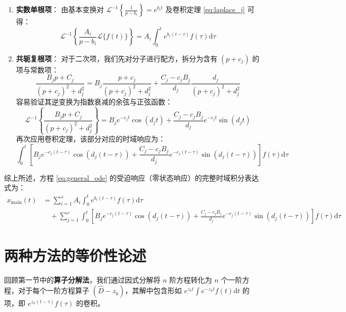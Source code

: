 \documentclass[11pt,a4paper]{ctexart}
\newcommand{\dd}{\mathrm{d}}
\begin{document}
\begin{enumerate}
    \item \textbf{实数单根项}：
    由基本变换对 \(\mathcal{L}^{-1}\left\{\frac{1}{p - b_i}\right\} = e^{b_i t}\) 及卷积定理 \eqref{eq:laplace_j} 可得：
    \begin{equation}
        \mathcal{L}^{-1}\left\{ \frac{A_i}{p - b_i} \mathcal{L}\{f(t)\} \right\} = A_i \int_{0}^{t} e^{b_i(t-\tau)} f(\tau) \dd \tau
    \end{equation}
    
    \item \textbf{共轭复根项}：
    对于二次项，我们先对分子进行配方，拆分为含有 \((p+c_j)\) 的项与常数项：
    \begin{equation}
        \frac{B_j p + C_j}{(p + c_j)^2 + d_j^2} = B_j \frac{p + c_j}{(p + c_j)^2 + d_j^2} + \frac{C_j - c_j B_j}{d_j} \frac{d_j}{(p + c_j)^2 + d_j^2}
    \end{equation}
    容易验证其逆变换为指数衰减的余弦与正弦函数：
    \begin{equation}
        \mathcal{L}^{-1}\left\{ \frac{B_j p + C_j}{(p + c_j)^2 + d_j^2} \right\} = B_j e^{-c_j t} \cos(d_j t) + \frac{C_j - c_j B_j}{d_j} e^{-c_j t} \sin(d_j t)
    \end{equation}
    再次应用卷积定理，该部分对应的时域响应为：
    \begin{equation}
        \int_{0}^{t} \left[ B_j e^{-c_j(t-\tau)} \cos(d_j(t-\tau)) + \frac{C_j - c_j B_j}{d_j} e^{-c_j(t-\tau)} \sin(d_j(t-\tau)) \right] f(\tau) \dd \tau
    \end{equation}
\end{enumerate}

综上所述，方程 \eqref{eq:general_ode} 的受迫响应（零状态响应）的完整时域积分表达式为：
\begin{align}
    x_{\text{main}}(t) &= \sum_{i=1}^{s} A_i \int_{0}^{t} e^{b_i(t-\tau)} f(\tau) \dd \tau \nonumber \\
    &\quad + \sum_{j=1}^{r} \int_{0}^{t} \left[ B_j e^{-c_j(t-\tau)} \cos(d_j(t-\tau)) + \frac{C_j - c_j B_j}{d_j} e^{-c_j(t-\tau)} \sin(d_j(t-\tau)) \right] f(\tau) \dd \tau
    \label{eq:final_solution}
\end{align}

\section{两种方法的等价性论述}

回顾第一节中的\textbf{算子分解法}，我们通过因式分解将 \(n\) 阶方程转化为 \(n\) 个一阶方程，对于每个一阶方程算子 \((\hat{D} - z_k)\)，其解中包含形如 \(e^{z_k t} \int e^{-z_k t} f(t) \dd t\) 的项，即 \(e^{z_k (t-\tau)} f(\tau)\) 的卷积。
\end{document}

